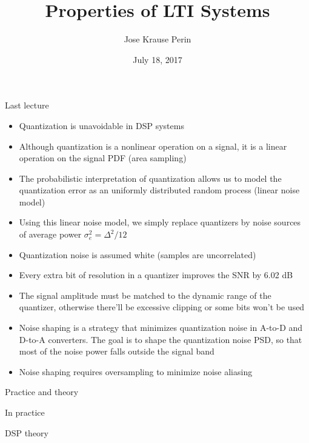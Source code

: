 \documentclass[10pt, handout]{beamer}
\title[EE 264]{Properties of LTI Systems}
\author{Jose Krause Perin}
\institute{Stanford University}
\date{July 18, 2017}
\begin{document}
\begin{frame}
  \titlepage
\end{frame}

%

%
\begin{frame}{Last lecture}
\begin{itemize}
	\item Quantization is unavoidable in DSP systems
	\item Although quantization is a nonlinear operation on a signal, it is a linear operation on the signal PDF (area sampling)
	\item The probabilistic interpretation of quantization allows us to model the quantization error as an uniformly distributed random process (linear noise model)
	\item Using this linear noise model, we simply replace quantizers by noise sources of average power $\sigma_e^2 = \Delta^2/12$
	\item Quantization noise is assumed white (samples are uncorrelated)
	\item Every extra bit of resolution in a quantizer improves the SNR by 6.02 dB
	\item The signal amplitude must be matched to the dynamic range of the quantizer, otherwise there'll be excessive clipping or some bits won't be used
	\item Noise shaping is a strategy that minimizes quantization noise in A-to-D and D-to-A converters. The goal is to shape the quantization noise PSD, so that most of the noise power falls outside the signal band
	\item Noise shaping requires oversampling to minimize noise aliasing
\end{itemize}
\end{frame}

%
\begin{frame}{Practice and theory}
\begin{block}{In practice}
	\begin{center}
		\resizebox{\linewidth}{!}{}
	\end{center}
\end{block}

\begin{block}{DSP theory}
	\begin{center}
		\resizebox{\linewidth}{!}{}
	\end{center}
\end{block}
\end{frame}
\end{document}
